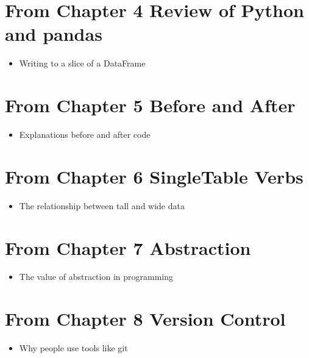 \documentclass[letterpaper,10pt,english]{jupyterBook}
\begin{document}
\section{From Chapter 4 \sphinxhyphen{} Review of Python and pandas}
\label{\detokenize{bigpic-list:from-chapter-4-review-of-python-and-pandas}}\begin{itemize}
\item {} 
\sphinxAtStartPar
Writing to a slice of a DataFrame

\end{itemize}


\section{From Chapter 5 \sphinxhyphen{} Before and After}
\label{\detokenize{bigpic-list:from-chapter-5-before-and-after}}\begin{itemize}
\item {} 
\sphinxAtStartPar
Explanations before and after code

\end{itemize}


\section{From Chapter 6 \sphinxhyphen{} Single\sphinxhyphen{}Table Verbs}
\label{\detokenize{bigpic-list:from-chapter-6-single-table-verbs}}\begin{itemize}
\item {} 
\sphinxAtStartPar
The relationship between tall and wide data

\end{itemize}


\section{From Chapter 7 \sphinxhyphen{} Abstraction}
\label{\detokenize{bigpic-list:from-chapter-7-abstraction}}\begin{itemize}
\item {} 
\sphinxAtStartPar
The value of abstraction in programming

\end{itemize}


\section{From Chapter 8 \sphinxhyphen{} Version Control}
\label{\detokenize{bigpic-list:from-chapter-8-version-control}}\begin{itemize}
\item {} 
\sphinxAtStartPar
Why people use tools like git

\end{itemize}
\end{document}
